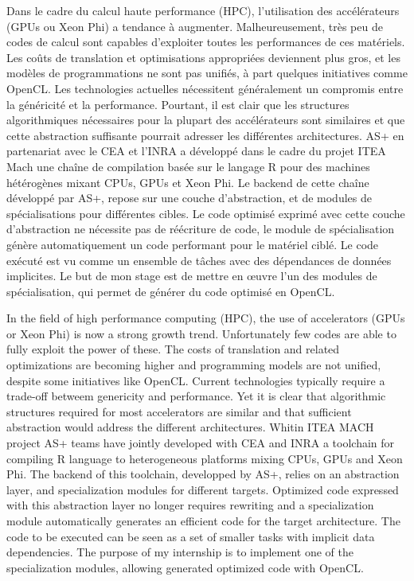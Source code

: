 \renewcommand{\abstractname}{Résumé}
\begin{abstract}
\end{abstract}
Dans le cadre du calcul haute performance (HPC), l'utilisation des accélérateurs
(GPUs ou Xeon Phi) a tendance à augmenter. Malheureusement, très peu de codes de
calcul sont capables d'exploiter toutes les performances de ces matériels.  Les
coûts de translation et optimisations appropriées deviennent plus gros, et les
modèles de programmations ne sont pas unifiés, à part quelques initiatives comme
OpenCL. Les technologies actuelles nécessitent généralement un compromis entre
la généricité et la performance. Pourtant, il est clair que les structures
algorithmiques nécessaires pour la plupart des accélérateurs sont similaires et
que cette abstraction suffisante pourrait adresser les différentes
architectures. AS+ en partenariat avec le CEA et l'INRA a développé dans le
cadre du projet ITEA Mach une chaîne de compilation basée sur le langage R pour
des machines hétérogènes mixant CPUs, GPUs et Xeon Phi. Le backend de cette
chaîne développé par AS+, repose sur une couche d'abstraction, et de modules de
spécialisations pour différentes cibles. Le code optimisé exprimé avec cette
couche d'abstraction ne nécessite pas de réécriture de code, le module de
spécialisation génère automatiquement un code performant pour le matériel ciblé.
Le code exécuté est vu comme un ensemble de tâches avec des dépendances de
données implicites. Le but de mon stage est de mettre en \oe{}uvre l'un des
modules de spécialisation, qui permet de générer du code optimisé en OpenCL.

\renewcommand{\abstractname}{Abstract}
\begin{abstract}
\end{abstract}
In the field of high performance computing (HPC), the use of accelerators (GPUs
or Xeon Phi) is now a strong growth trend. Unfortunately few codes are able to
fully exploit the power of these. The costs of translation and related
optimizations are becoming higher and programming models are not unified,
despite some initiatives like OpenCL. Current technologies typically require a
trade-off betweem genericity and performance. Yet it is clear that algorithmic
structures required for most accelerators are similar and that sufficient
abstraction would address the different architectures. Whitin ITEA MACH project
AS+ teams have jointly developed with CEA and INRA a toolchain for compiling R
language to heterogeneous platforms mixing CPUs, GPUs and Xeon Phi. The backend
of this toolchain, developped by AS+, relies on an abstraction layer, and
specialization modules for different targets. Optimized code expressed with this
abstraction layer no longer requires rewriting and a specialization module
automatically generates an efficient code for the target architecture. The code
to be executed can be seen as a set of smaller tasks with implicit data
dependencies. The purpose of my internship is to implement one of the
specialization modules, allowing generated optimized code with OpenCL.
